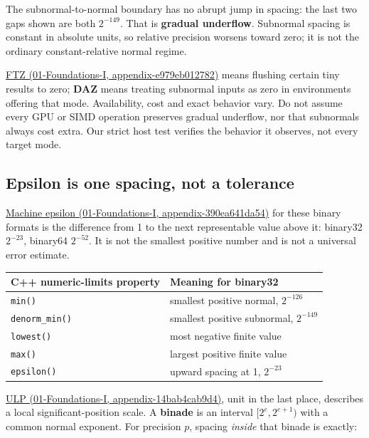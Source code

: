 The subnormal-to-normal boundary has no abrupt jump in spacing: the last two gaps shown are both \(2^{-149}\). That is \textbf{gradual underflow}. Subnormal spacing is constant in absolute units, so relative precision worsens toward zero; it is not the ordinary constant-relative normal regime.

\href{../01-Foundations-I/main.pdf\#nameddest=appendix-e979eb012782}{FTZ (01-Foundations-I, appendix-e979eb012782)} means flushing certain tiny results to zero; \textbf{DAZ} means treating subnormal inputs as zero in environments offering that mode. Availability, cost and exact behavior vary. Do not assume every GPU or SIMD operation preserves gradual underflow, nor that subnormals always cost extra. Our strict host test verifies the behavior it observes, not every target mode.

\subsection{Epsilon is one spacing, not a tolerance}\label{05-engine-i-ch001-epsilon-is-one-spacing-not-a-tolerance}

\href{../01-Foundations-I/main.pdf\#nameddest=appendix-390ea641da54}{Machine epsilon (01-Foundations-I, appendix-390ea641da54)} for these binary formats is the difference from 1 to the next representable value above it: binary32 \(2^{-23}\), binary64 \(2^{-52}\). It is not the smallest positive number and is not a universal error estimate.

{\def\LTcaptype{none} %
\begin{longtable}[]{@{}ll@{}}
\toprule\noalign{}
C++ numeric-limits property & Meaning for binary32 \\
\midrule\noalign{}
\endhead
\bottomrule\noalign{}
\endlastfoot
\texttt{min()} & smallest positive normal, \(2^{-126}\) \\
\texttt{denorm\_min()} & smallest positive subnormal, \(2^{-149}\) \\
\texttt{lowest()} & most negative finite value \\
\texttt{max()} & largest positive finite value \\
\texttt{epsilon()} & upward spacing at 1, \(2^{-23}\) \\
\end{longtable}
}

\href{../01-Foundations-I/main.pdf\#nameddest=appendix-14bab4cab9d4}{ULP (01-Foundations-I, appendix-14bab4cab9d4)}, unit in the last place, describes a local significant-position scale. A \textbf{binade} is an interval \([2^e,2^{e+1})\) with a common normal exponent. For precision \(p\), spacing \emph{inside} that binade is exactly:

